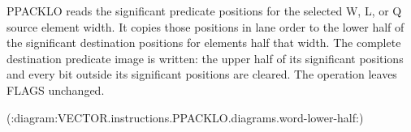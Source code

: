 PPACKLO reads the significant predicate positions for the selected W, L, or Q
source element width.  It copies those positions in lane order to the lower
half of the significant destination positions for elements half that width.
The complete destination predicate image is written: the upper half of its
significant positions and every bit outside its significant positions are cleared.  The operation
leaves FLAGS unchanged.

(:diagram:VECTOR.instructions.PPACKLO.diagrams.word-lower-half:)
